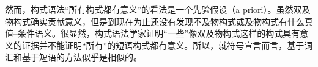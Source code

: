然而，构式语法“所有构式都有意义”的看法是一个先验假设（a priori）。虽然双及物构式确实贡献意义，但是到现在为止还没有发现不及物构式或及物构式有什么真值--条件语义。很显然，构式语法学家证明“一些”像双及物构式这样的构式具有意义的证据并不能证明“所有”的短语构式都有意义。所以，就符号宣言而言，基于词汇和基于短语的方法似乎是相似的。
